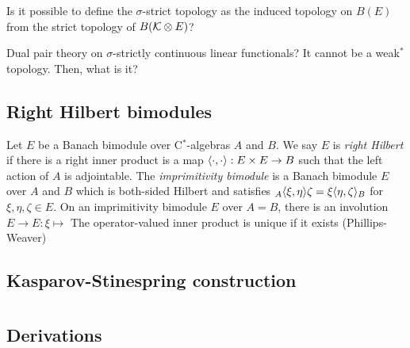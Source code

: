 \documentclass{../../large}
\begin{document}
\begin{prb}
Is it possible to define the $\sigma$-strict topology as the induced topology on $B(E)$ from the strict topology of $B(\mathcal{K}\otimes E)$?

Dual pair theory on $\sigma$-strictly continuous linear functionals?
It cannot be a weak$^*$ topology. Then, what is it?
\end{prb}



\section{Right Hilbert bimodules}

\begin{prb}
Let $E$ be a Banach bimodule over C$^*$-algebras $A$ and $B$.
We say $E$ is \emph{right Hilbert} if there is a right inner product is a map $\langle\cdot,\cdot\rangle:E\times E\to B$ such that the left action of $A$ is adjointable.
The \emph{imprimitivity bimodule} is a Banach bimodule $E$ over $A$ and $B$ which is both-sided Hilbert and satisfies ${}_A\langle\xi,\eta\rangle\zeta=\xi\langle\eta,\zeta\rangle_B$ for $\xi,\eta,\zeta\in E$.
On an imprimitivity bimodule $E$ over $A=B$, there is an involution $E\to E:\xi\mapsto $
The operator-valued inner product is unique if it exists (Phillips-Weaver)
\end{prb}

\begin{prb}
\end{prb}

\begin{prb}
\end{prb}







\section{Kasparov-Stinespring construction}





\chapter{}




\section{Derivations}
\begin{prb}
\end{prb}
\end{document}

